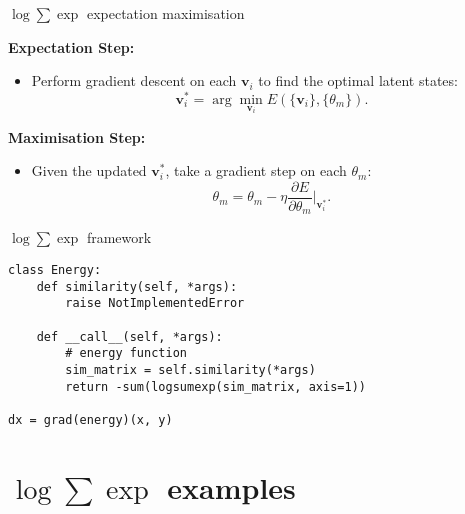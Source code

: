 \documentclass{beamer}
\begin{document}
\begin{frame}{$\log \sum \exp$ expectation maximisation}
    \bigskip

    \textbf{Expectation Step:} 
    \begin{itemize}
        \item Perform gradient descent on each \(\bm{v}_i\) to find the optimal latent states:
        \[
        \bm{v}_i^* = \arg \min_{\bm{v}_i} E(\{\bm{v}_i\}, \{\theta_m\}).
        \]
    \end{itemize}

    \bigskip

    \textbf{Maximisation Step:} 
    \begin{itemize}
        \item Given the updated \(\bm{v}_i^*\), take a gradient step on each \(\theta_m\):
        \[
        \theta_m = \theta_m - \eta \frac{\partial E}{\partial \theta_m} \Big|_{\bm{v}_i^*}.
        \]
    \end{itemize}

\end{frame}



\begin{frame}[fragile]{$\log \sum \exp$ framework}

\begin{verbatim}
class Energy:
    def similarity(self, *args):
        raise NotImplementedError

    def __call__(self, *args):
        # energy function
        sim_matrix = self.similarity(*args) 
        return -sum(logsumexp(sim_matrix, axis=1))

dx = grad(energy)(x, y)
\end{verbatim}
\end{frame}


\section{$\log \sum \exp$ examples}
\end{document}
